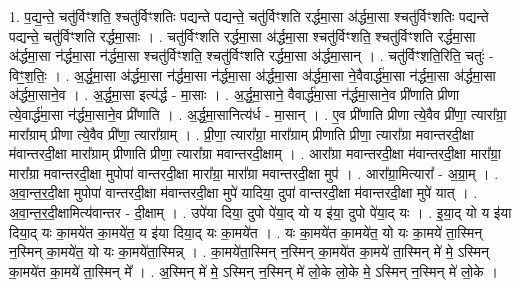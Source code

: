 \documentclass[17pt]{extarticle}
\begin{document}
1. प॒द्य॒न्ते॒ चतु॑र्विꣳशति॒ श्चतु॑र्विꣳशतिः पद्यन्ते पद्यन्ते॒ चतु॑र्विꣳशति रर्द्धमा॒सा अ॑र्द्धमा॒सा श्चतु॑र्विꣳशतिः पद्यन्ते पद्यन्ते॒ चतु॑र्विꣳशति रर्द्धमा॒साः । . चतु॑र्विꣳशति रर्द्धमा॒सा अ॑र्द्धमा॒सा श्चतु॑र्विꣳशति॒ श्चतु॑र्विꣳशति रर्द्धमा॒सा अ॑र्द्धमा॒सा न॑र्द्धमा॒सा न॑र्द्धमा॒सा श्चतु॑र्विꣳशति॒ श्चतु॑र्विꣳशति रर्द्धमा॒सा अ॑र्द्धमा॒सान् । . चतु॑र्विꣳशति॒रिति॒ चतुः॑ - विꣳ॒॒श॒तिः॒ । . अ॒र्द्ध॒मा॒सा अ॑र्द्धमा॒सा न॑र्द्धमा॒सा न॑र्द्धमा॒सा अ॑र्द्धमा॒सा अ॑र्द्धमा॒सा ने॒वैवार्द्ध॑मा॒सा न॑र्द्धमा॒सा अ॑र्द्धमा॒सा अ॑र्द्धमा॒साने॒व । . अ॒र्द्ध॒मा॒सा इत्य॑र्द्ध - मा॒साः । . अ॒र्द्ध॒मा॒साने॒ वैवार्द्ध॑मा॒सा न॑र्द्धमा॒साने॒व प्री॑णाति प्रीणा त्ये॒वार्द्ध॑मा॒सा न॑र्द्धमा॒साने॒व प्री॑णाति । . अ॒र्द्ध॒मा॒सानित्य॑र्ध - मा॒सान् । . ए॒व प्री॑णाति प्रीणा त्ये॒वैव प्री॑णा॒ त्यारा᳚ग्रा॒ मारा᳚ग्राम् प्रीणा त्ये॒वैव प्री॑णा॒ त्यारा᳚ग्राम् । . प्री॒णा॒ त्यारा᳚ग्रा॒ मारा᳚ग्राम् प्रीणाति प्रीणा॒ त्यारा᳚ग्रा मवान्तरदी॒क्षा म॑वान्तरदी॒क्षा मारा᳚ग्राम् प्रीणाति प्रीणा॒ त्यारा᳚ग्रा मवान्तरदी॒क्षाम् । . आरा᳚ग्रा मवान्तरदी॒क्षा म॑वान्तरदी॒क्षा मारा᳚ग्रा॒ मारा᳚ग्रा मवान्तरदी॒क्षा मुपोपा॑ वान्तरदी॒क्षा मारा᳚ग्रा॒ मारा᳚ग्रा मवान्तरदी॒क्षा मुप॑ । . आरा᳚ग्रा॒मित्यारा᳚ - अ॒ग्रा॒म् । . अ॒वा॒न्त॒र॒दी॒क्षा मुपोपा॑ वान्तरदी॒क्षा म॑वान्तरदी॒क्षा मुपे॑ यादिया॒ दुपा॑ वान्तरदी॒क्षा म॑वान्तरदी॒क्षा मुपे॑ यात् । . अ॒वा॒न्त॒र॒दी॒क्षामित्य॑वान्तर - दी॒क्षाम् । . उपे॑या दिया॒ दुपो पे॑या॒द् यो य इ॑या॒ दुपो पे॑या॒द् यः । . इ॒या॒द् यो य इ॑या दिया॒द् यः का॒मये॑त का॒मये॑त॒ य इ॑या दिया॒द् यः का॒मये॑त । . यः का॒मये॑त का॒मये॑त॒ यो यः का॒मये॑ ता॒स्मिन् न॒स्मिन् का॒मये॑त॒ यो यः का॒मये॑ता॒स्मिन्न् । . का॒मये॑ता॒स्मिन् न॒स्मिन् का॒मये॑त का॒मये॑ ता॒स्मिन् मे॑ मे॒ ऽस्मिन् का॒मये॑त का॒मये॑ ता॒स्मिन् मे᳚ । . अ॒स्मिन् मे॑ मे॒ ऽस्मिन् न॒स्मिन् मे॑ लो॒के लो॒के मे॒ ऽस्मिन् न॒स्मिन् मे॑ लो॒के । \newline
\end{document}
